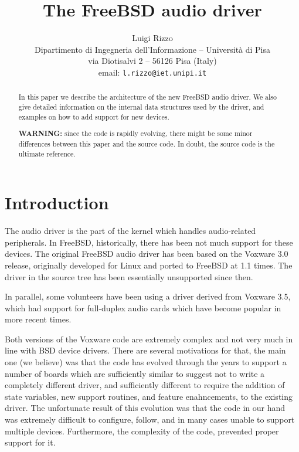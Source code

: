 \documentclass[11pt]{article}
\begin{document}
\author{Luigi Rizzo\\
    Dipartimento di Ingegneria dell'Informazione -- Universit\`a di Pisa\\
    via Diotisalvi 2 -- 56126 Pisa (Italy)\\
    email: {\tt l.rizzo@iet.unipi.it}}
\title{The FreeBSD audio driver}
\maketitle

\begin{abstract}
In this paper we describe the architecture of the new FreeBSD audio
driver. We also give detailed information on the internal data
structures used by the driver, and examples on how to add support
for new devices.

{\bf WARNING:} since the code is rapidly evolving, there might be some
minor differences between this paper and the source code. In doubt,
the source code is the ultimate reference.

\end{abstract}

\section{Introduction}

The audio driver is the part of the kernel which handles audio-related
peripherals. In FreeBSD, historically, there has been not much support
for these devices. The original FreeBSD audio driver has been based on
the Voxware 3.0 release, originally developed for Linux and ported to
FreeBSD at 1.1 times. The driver in the source tree has been
essentially unsupported since then.

In parallel, some volunteers have been using a driver derived from
Voxware 3.5, which had support for full-duplex audio cards which have
become popular in more recent times.

Both versions of the Voxware code are extremely complex and not very
much in line with BSD device drivers. There are several motivations
for that, the main one (we believe) was that the code has evolved
through the years to support a number of boards which are sufficiently
similar to suggest not to write a completely different driver, and
sufficiently different to require the addition of state variables, new
support routines, and feature enahncements, to the existing driver.
The unfortunate result of this evolution was that the code in our hand
was extremely difficult to configure, follow, and in many cases unable to
support multiple devices. Furthermore, the complexity of the code,
prevented proper support for it.
\end{document}
